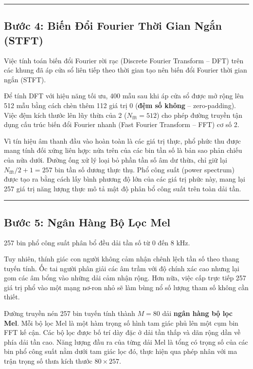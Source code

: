 \documentclass[11pt,a4paper]{article}
\begin{document}
\smallskip
\hrule
\smallskip

\subsection*{Bước 4: Biến Đổi Fourier Thời Gian Ngắn (STFT)}

Việc tính toán biến đổi Fourier rời rạc (Discrete Fourier Transform -- DFT) trên các khung đã áp cửa sổ liên tiếp theo thời gian tạo nên biến đổi Fourier thời gian ngắn (STFT).

Để tính DFT với hiệu năng tối ưu, 400 mẫu sau khi áp cửa sổ được mở rộng lên 512 mẫu bằng cách chèn thêm 112 giá trị 0 (\textbf{đệm số không} -- zero-padding). Việc đệm kích thước lên lũy thừa của 2 ($N_{\text{fft}} = 512$) cho phép đường truyền tận dụng cấu trúc biến đổi Fourier nhanh (Fast Fourier Transform -- FFT) cơ số 2.

Vì tín hiệu âm thanh đầu vào hoàn toàn là các giá trị thực, phổ phức thu được mang tính đối xứng liên hợp: nửa trên của các bin tần số là bản sao phản chiếu của nửa dưới. Đường ống xử lý loại bỏ phần tần số âm dư thừa, chỉ giữ lại $N_{\text{fft}} / 2 + 1 = 257$ bin tần số dương thực thụ. Phổ công suất (power spectrum) được tạo ra bằng cách lấy bình phương độ lớn của các giá trị phức này, mang lại 257 giá trị năng lượng thực mô tả mật độ phân bổ công suất trên toàn dải tần.

\smallskip
\hrule
\smallskip

\subsection*{Bước 5: Ngân Hàng Bộ Lọc Mel}

257 bin phổ công suất phân bổ đều dải tần số từ 0 đến 8 kHz.

Tuy nhiên, thính giác con người không cảm nhận chênh lệch tần số theo thang tuyến tính. Ốc tai người phân giải các âm trầm với độ chính xác cao nhưng lại gom các âm bổng vào những dải cảm nhận rộng. Hơn nữa, việc cấp trực tiếp 257 giá trị phổ vào một mạng nơ-ron nhỏ sẽ làm bùng nổ số lượng tham số không cần thiết.

Đường truyền nén 257 bin tuyến tính thành $M = 80$ dải \textbf{ngân hàng bộ lọc Mel}. Mỗi bộ lọc Mel là một hàm trọng số hình tam giác phủ lên một cụm bin FFT kế cận. Các bộ lọc được bố trí dày đặc ở dải tần thấp và dãn rộng dần về phía dải tần cao. Năng lượng đầu ra của từng dải Mel là tổng có trọng số của các bin phổ công suất nằm dưới tam giác lọc đó, thực hiện qua phép nhân với ma trận trọng số thưa kích thước $80 \times 257$.
\end{document}
